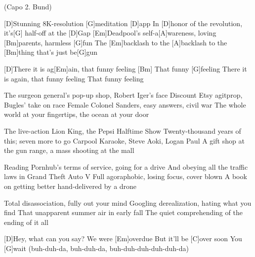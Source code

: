 
{ \footnotesize(Capo 2. Bund)}

\begin{guitar}
	[D]Stunning 8K-resolution [G]meditation [D]app
	In [D]honor of the revolution, it's[G] half-off at the [D]Gap
	[Em]Deadpool's self-a[A]wareness, loving [Bm]parents, harmless [G]fun
	The [Em]backlash to the [A]backlash to the [Bm]thing that's just be[G]gun
	
	[D]There it is ag[Em]ain, that funny feeling
	[Bm] That funny [G]feeling
	There it is again, that funny feeling
	That funny feeling
	
	The surgeon general's pop-up shop, Robert Iger's face
	Discount Etsy agitprop, Bugles' take on race
	Female Colonel Sanders, easy answers, civil war
	The whole world at your fingertips, the ocean at your door
	
	The live-action Lion King, the Pepsi Halftime Show
	Twenty-thousand years of this; seven more to go
	Carpool Karaoke, Steve Aoki, Logan Paul
	A gift shop at the gun range, a mass shooting at the mall
	
	 
	
	Reading Pornhub's terms of service, going for a drive
	And obeying all the traffic laws in Grand Theft Auto V
	Full agoraphobic, losing focus, cover blown
	A book on getting better hand-delivered by a drone
	
	Total disassociation, fully out your mind
	Googling derealization, hating what you find
	That unapparent summer air in early fall
	The quiet comprehending of the ending of it all
	
	 
	\pagebreak
	[D]Hey, what can you say?
	We were [Em]overdue
	But it'll be [C]over soon
	You [G]wait (buh-duh-da, buh-duh-da, buh-duh-duh-duh-duh-da)
\end{guitar}